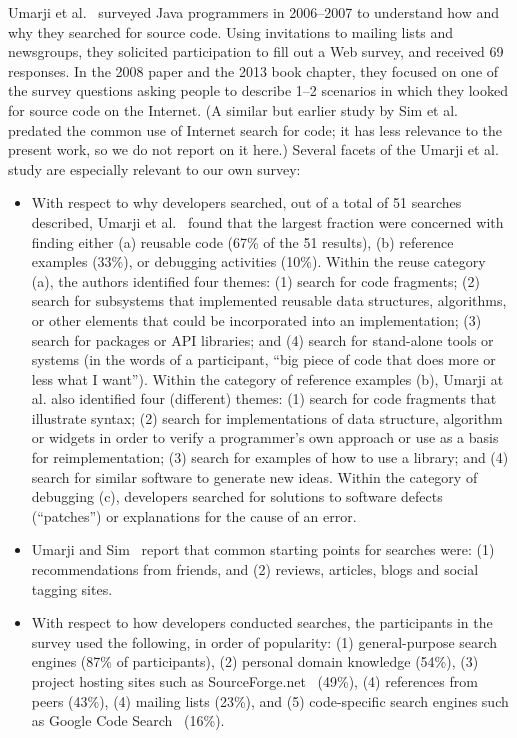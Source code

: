 \documentclass{casicswhitepaper}
\begin{document}
Umarji et al.~\cite{umarji_2008, umarji_2013} surveyed Java programmers in 2006--2007 to understand how and why they searched for source code.  Using invitations to mailing lists and newsgroups, they solicited participation to fill out a Web survey, and received 69 responses.  In the 2008 paper and the 2013 book chapter, they focused on one of the survey questions asking people to describe 1--2 scenarios in which they looked for source code on the Internet.  (A similar but earlier study by Sim et al.~\cite{sim_1998} predated the common use of Internet search for code; it has less relevance to the present work, so we do not report on it here.)  Several facets of the Umarji et al. study are especially relevant to our own survey:

\begin{itemize}

\item With respect to why developers searched, out of a total of 51 searches described, Umarji et al.~\cite{umarji_2008} found that the largest fraction were concerned with finding either (a) reusable code (67\% of the 51 results), (b) reference examples (33\%), or debugging activities (10\%).  Within the reuse category (a), the authors identified four themes: (1) search for code fragments; (2) search for subsystems that implemented reusable data structures, algorithms, or other elements that could be incorporated into an implementation; (3) search for packages or API libraries; and (4) search for stand-alone tools or systems (in the words of a participant, ``big piece of code that does more or less what I want'').  Within the category of reference examples (b), Umarji at al. also identified four (different) themes: (1) search for code fragments that illustrate syntax; (2) search for implementations of data structure, algorithm or widgets in order to verify a programmer's own approach or use as a basis for reimplementation; (3) search for examples of how to use a library; and (4) search for similar software to generate new ideas.  Within the category of debugging (c), developers searched for solutions to software defects (``patches'') or explanations for the cause of an error.

\item Umarji and Sim~\cite{umarji_2013} report that common starting points for searches were: (1) recommendations from friends, and (2) reviews, articles, blogs and social tagging sites.

\item With respect to how developers conducted searches, the participants in the survey used the following, in order of popularity: (1) general-purpose search engines (87\% of participants), (2) personal domain knowledge (54\%), (3) project hosting sites such as SourceForge.net~\cite{sourceforge_1999} (49\%), (4) references from peers (43\%), (4) mailing lists (23\%), and (5) code-specific search engines such as Google Code Search~\cite{googlecodesearch_2006} (16\%).


\end{itemize}
\end{document}

